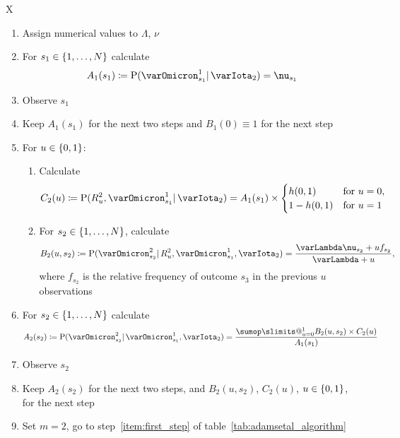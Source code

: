 \documentclass[\ifafour a4paper,12pt,\else a5paper,10pt,\fi%
onecolumn,oneside,article,%
british%
]{memoir}
\makeatletter
\theoremstyle{remark}
\theoremstyle{innote}
\def\sum{\DOTSI\sumop\slimits@}
\newcommand*{\defd}{\coloneqq}
\DeclarePairedDelimiter\set{\{}{\}}
\newcommand*{\p}{\mathrm{P}}%
\renewcommand*{\|}{\mathpunct{|}}
\newcommand*{\yff}{f}
\newcommand*{\yI}{\varIota}
\newcommand*{\yO}{\varOmicron}
\newcommand*{\yMc}{\yI_2}
\newcommand*{\yN}{\varLambda}
\newcommand*{\ynn}{\nu}
\newcommand*{\yrs}{h}
\makeatother
\begin{document}
\begin{table}[!p]
  \centering
  \caption{Initial steps of predictive algorithm}
  \label{tab:adamsetal_initial}
  \begin{tabularx}{\textwidth}{X}\hline
    \begin{enumerate}%
    \item Assign numerical values to $\yN$, $\ynn$
    \item For $s_1 \in \set{1,\dotsc,N}$ calculate
      \[A_1(s_1)\defd \p(\yO^{1}_{s_{1}} \|  \yMc) =\ynn_{s_1} \]
    \item Observe $s_1$
    \item Keep  $A_1(s_1)$ for the next two steps and $B_1(0)\equiv 1$ for
      the next step

      \bigskip
    \item For $u \in\set{0,1}$:
      \begin{enumerate}[label*=\arabic*.]
   \item Calculate
      \[
        C_2(u) \defd \p(R^{2}_{u}, \yO^{1}_{s_1} \| \yMc)
        =
A_1(s_1) \times \begin{cases}
          \yrs(0,1) &\text{for $u=0$},\\ 1-\yrs(0,1)&\text{for $u=1$}
        \end{cases}
      \]
      \item For $s_{2} \in \set{1,\dotsc,N}$, calculate
        \[ 
          B_{2}(u,s_{2}) \defd
          \p(\yO^{2}_{s_{2}} \| R^{2}_{u}, \yO^{1}_{s_{1}}, \yMc) =
         \frac{\yN\ynn_{s_{2}}+u\yff_{s_{2}}}{\yN + u},
        \]
     where $\yff_{s_{2}}$ is the relative frequency of outcome $s_{3}$ in
     the previous $u$ observations
    \end{enumerate}
  \item  For $s_2 \in \set{1,\dotsc,N}$ calculate
      \[A_2(s_2) \defd
        \p(\yO^{2}_{s_{2}} \| \yO^{1}_{s_{1}}, \yMc) =
\frac{\sum_{u=0}^{1} B_{2}(u,s_{2}) \times C_{2}(u)}{A_{1}(s_{1})} \]
\item Observe $s_2$
\item Keep $A_{2}(s_{2})$ for the next two steps, and
  $B_{2}(u,s_{2})$, $C_{2}(u)$, $u\in\set{0,1}$, for the next step
\item Set $m=2$, go to step~\ref{item:first_step} of table~\ref{tab:adamsetal_algorithm}
\end{enumerate}
\\\hline
  \end{tabularx}
\end{table}
\end{document}
